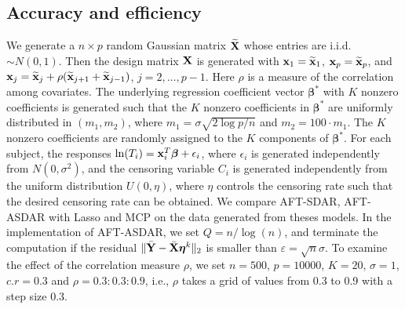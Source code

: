 \documentclass[12pt]{article}
\newcommand{\bX}{{\bf X}}
\newcommand{\bx}{\mbox{\bf x}}
\newcommand{\bY}{\mbox{\bf Y}}
\newcommand{\bbeta}{\boldsymbol{\beta}}
\newcommand{\boldeta}{\boldsymbol{\eta}}
\begin{document}
\subsection{Accuracy and efficiency}
\label{sec:7}
We  generate a $n\times p$ random Gaussian matrix $\widetilde{\bX}$
whose entries are i.i.d. $\sim N(0,1)$. Then the design matrix $\bX$ is generated with $\bx_1=\widetilde{\bx}_1$, $\bx_p=\widetilde{\bx}_p$, and $\bx_j=\widetilde{\bx}_j+\rho(\widetilde{\bx}_{j+1}+\widetilde{\bx}_{j-1})$, $j=2,\ldots,p-1$. Here $\rho$ is a measure of the correlation among covariates. The underlying regression coefficient vector $\bbeta^*$ with
$K$ nonzero coefficients is generated
such that the $K$ nonzero coefficients in $\bbeta^*$ are uniformly
distributed in $(m_1,m_2)$, where $m_1=\sigma\sqrt{2\log{p}/n}$
and $m_2=100\cdot m_1$.
The $K$ nonzero coefficients are  randomly assigned to the $K$ components of $\bbeta^*$.
For each subject,
the responses $\ln(T_{i})=\bx_i^T\bbeta+\epsilon_i$, where $\epsilon_i$ is generated independently from $N(0,\sigma^2)$,
and the censoring variable $C_i$ is generated independently from the uniform distribution $U(0,\eta)$, where $\eta$ controls the censoring rate such that the desired censoring rate can be obtained.
We compare AFT-SDAR, AFT-ASDAR with Lasso and MCP  on the data generated from theses models.
In the implementation of AFT-ASDAR, we set $Q=n/\log(n)$, and terminate the computation if the residual $\|\bar{\bY}-\bar{\bX}\boldeta^k\|_2$ is smaller than $\varepsilon=\sqrt{n}\sigma$.
To examine the effect of  the correlation measure $\rho$,
we set $n=500$, $p=10000$, $K=20$, $\sigma=1$, $c.r=0.3$ and $\rho=0.3:0.3:0.9$, i.e., $\rho$ takes a grid of values from 0.3 to 0.9 with a step size 0.3.
\end{document}

